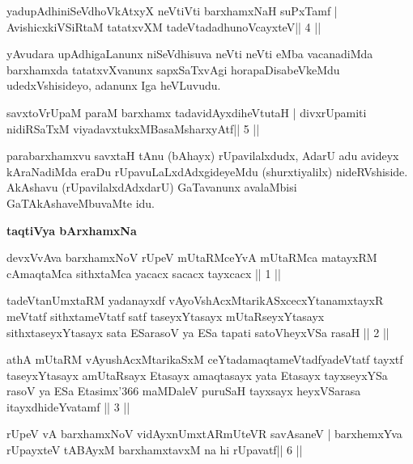 \begin{shl}
yadupAdhiniSeVdhoVkAtxyX neVtiVti barxhamxNaH suPxTamf |
AvishicxkiVSiRtaM tatatxvXM tadeVtadadhunoVcayxteV\hfill || 4 ||
\end{shl}

\begin{artha}
yAvudara upAdhigaLanunx niSeVdhisuva neVti neVti eMba vacanadiMda barxhamxda tatatxvXvanunx sapxSaTxvAgi horapaDisabeVkeMdu udedxVshisideyo, adanunx Iga heVLuvudu.
\end{artha}



\begin{shl}
savxtoV\s rUpaM paraM barxhamx tadavidAyxdiheVtutaH |
divxrUpamiti nidiRSaTxM viyadavxtukxMBasaMsharxyAtf\hfill || 5 ||
\end{shl}

\begin{artha}
parabarxhamxvu savxtaH tAnu (bAhayx) rUpavilalxdudx, AdarU adu avideyx kAraNadiMda eraDu rUpavuLaLxdAdxgideyeMdu (shurxtiyalilx)  nideRVshiside. AkAshavu (rUpavilalxdAdxdarU) GaTavanunx avalaMbisi GaTAkAshaveMbuvaMte idu.
\end{artha}



{\centerline{\textbf{taqtiVya bArxhamxNa}}}
\medskip
{}

\begin{kandikeshl}
devxVvAva barxhamxNoV rUpeV mUtaRMceYvA mUtaRMca
matayxRM cAmaqtaMca sithxtaMca yacacx sacacx tayxcacx || 1 ||

tadeVtanUmxtaRM yadanayxdf vAyoVshAcxMtarikASxcecxYtanamxtayxR
meVtatf sithxtameVtatf satf taseyxYtasayx mUtaRseyxYtasayx
sithxtaseyxYtasayx sata ESarasoV ya ESa tapati satoVheyxVSa rasaH || 2 || 

athA mUtaRM vAyushAcxMtarikaSxM ceYtadamaqtameVtadfyadeVtatf tayxtf
taseyxYtasayx amUtaRsayx Etasayx amaqtasayx yata Etasayx tayxseyxYSa
rasoV ya ESa Etasimx\char'366 maMDaleV puruSaH tayxsayx heyxVSarasa
itayxdhideYvatamf || 3 ||
\end{kandikeshl}


\begin{shl}
rUpeV vA barxhamxNoV vidAyxnUmxtARmUteVR savAsaneV |
barxhemxYva rUpayxteV tABAyxM barxhamxtavxM na hi rUpavatf\hfill || 6 ||
\end{shl}

